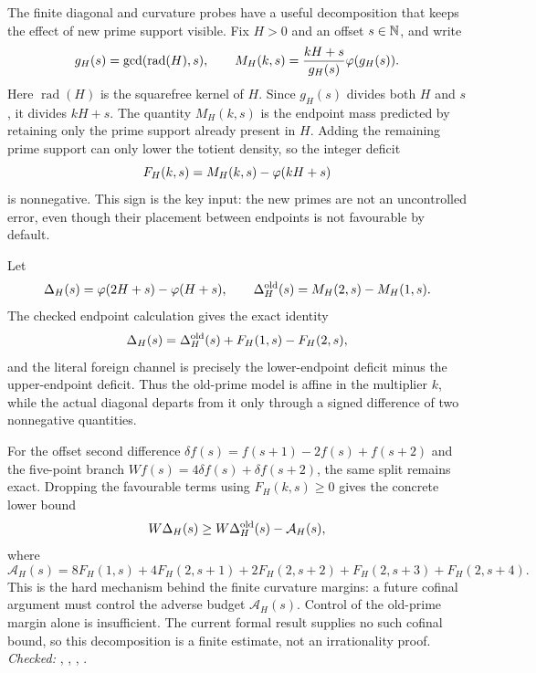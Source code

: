 \documentclass[11pt]{article}
\begin{document}
The finite diagonal and curvature probes have a useful decomposition that
keeps the effect of new prime support visible.  Fix \(H>0\) and an offset
\(s\in\mathbb{N}\), and write
\[
 g_H(s)=\gcd(\operatorname{rad}(H),s),
 \qquad
 M_H(k,s)=\frac{kH+s}{g_H(s)}\varphi(g_H(s)).
\]
Here \(\operatorname{rad}(H)\) is the squarefree kernel of \(H\).  Since
\(g_H(s)\) divides both \(H\) and \(s\), it divides \(kH+s\).  The quantity
\(M_H(k,s)\) is the endpoint mass predicted by retaining only the prime
support already present in \(H\).  Adding the remaining prime support can only
lower the totient density, so the integer deficit
\[
 F_H(k,s)=M_H(k,s)-\varphi(kH+s)
\]
is nonnegative.  This sign is the key input: the new primes are not an
uncontrolled error, even though their placement between endpoints is not
favourable by default.

Let
\[
 \Delta_H(s)=\varphi(2H+s)-\varphi(H+s),
 \qquad
 \Delta_H^{\rm old}(s)=M_H(2,s)-M_H(1,s).
\]
The checked endpoint calculation gives the exact identity
\[
 \Delta_H(s)=\Delta_H^{\rm old}(s)+F_H(1,s)-F_H(2,s),
\]
and the literal foreign channel is precisely the lower-endpoint deficit minus
the upper-endpoint deficit.  Thus the old-prime model is affine in the
multiplier \(k\), while the actual diagonal departs from it only through a
signed difference of two nonnegative quantities.

For the offset second difference
\(
 \delta f(s)=f(s+1)-2f(s)+f(s+2)
\)
and the five-point branch
\(Wf(s)=4\delta f(s)+\delta f(s+2)\), the same split remains exact.  Dropping
the favourable terms using \(F_H(k,s)\ge0\) gives the concrete lower bound
\[
 W\Delta_H(s)\ge W\Delta_H^{\rm old}(s)-\mathcal A_H(s),
\]
where
\[
 \mathcal A_H(s)=8F_H(1,s)+4F_H(2,s+1)+2F_H(2,s+2)
                  +F_H(2,s+3)+F_H(2,s+4).
\]
This is the hard mechanism behind the finite curvature margins: a future
cofinal argument must control the adverse budget \(\mathcal A_H(s)\).  Control
of the old-prime margin alone is insufficient.  The current formal result supplies no such cofinal
bound, so this decomposition is a finite estimate, not an irrationality proof.
{\footnotesize\emph{Checked:}
,
,
,
.}
\end{document}
